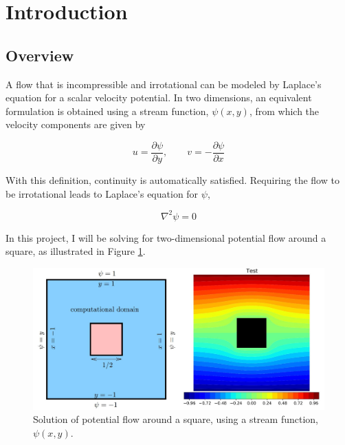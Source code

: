 \pagebreak
\section{Introduction}

    \subsection{Overview}
    A flow that is incompressible and irrotational can be modeled by Laplace’s equation for a scalar velocity potential. In two dimensions, an equivalent formulation is obtained using a stream function, $\psi(x, y)$, from which the velocity components are given by

    \begin{equation}
        u = \frac{\partial \psi}{\partial y},\qquad v = -\frac{\partial \psi}{\partial x}
        \label{eqn:velocity}
    \end{equation}

    With this definition, continuity is automatically satisfied. Requiring the flow to be irrotational leads to Laplace’s equation for $\psi$,

    \begin{equation}
        \nabla^2\psi = 0
        \label{eqn:laplace_eqn}
    \end{equation}

    In this project, I will be solving for two-dimensional potential flow around a square, as illustrated in Figure \ref{fig:solution}.

    \begin{figure}[h]
        \centering
        \includegraphics[width = 0.9\linewidth]{rep/solution.JPG}
        \caption[Solution of Potential Flow Around a Square]{Solution of potential flow around a square, using a stream function, $\psi(x, y)$.}
        \label{fig:solution}
    \end{figure}

